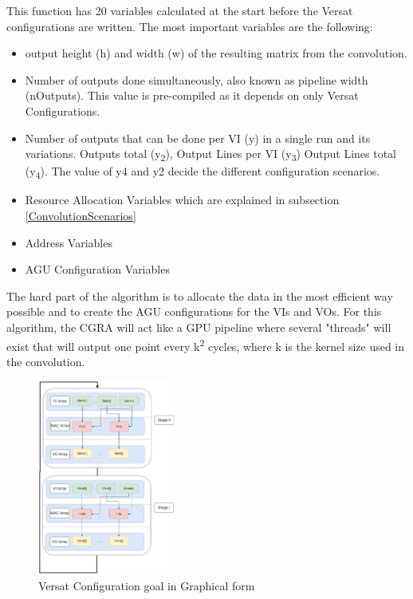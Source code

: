 \documentclass[conference]{IEEEtran}
\begin{document}
This function has 20 variables calculated at the start before the Versat configurations are written. The most important
variables are the following:

\begin{itemize}
	\item output height (h) and width (w) of the resulting matrix from the convolution.
	\item Number of outputs done simultaneously, also known as pipeline width (nOutputs). This value is pre-compiled as it depends on only Versat Configurations.
	\item Number of outputs that can be done per VI (y) in a single run and its variations. Outputs total (y\textsubscript{2}), Output Lines per VI (y\textsubscript{3}) Output Lines total (y\textsubscript{4}).
The value of y4 and y2 decide the different configuration scenarios.
	\item Resource Allocation Variables
which are explained in subsection \ref{ConvolutionScenarios}
	\item Address Variables
	\item AGU Configuration Variables
  \end{itemize}

The hard part of the algorithm is to allocate the data in the most efficient way possible and to create the AGU configurations
for the VIs and VOs. For this algorithm, the CGRA will act like a GPU pipeline where several "threads" will exist
that will output one point every k\textsuperscript{2} cycles, where k is the kernel size used in the convolution.

\begin{figure}[!htbp]
    \centering
    \includegraphics[width=0.4\textwidth]{Figures/Convolution.drawio.png}
    \caption{Versat Configuration goal in Graphical form}
    \label{VersatConfiguration}
\end{figure}
\end{document}
